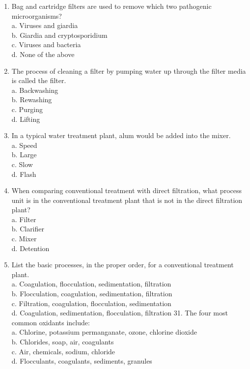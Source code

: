 \begin{enumerate}
\item Bag and cartridge filters are used to remove which two pathogenic microorganisms?\\
a. Viruses and giardia\\
b. Giardia and cryptosporidium\\
c. Viruses and bacteria\\
d. None of the above\\
\item The process of cleaning a filter by pumping water up through the filter media is called the filter.\\
a. Backwashing\\
b. Rewashing\\
c. Purging\\
d. Lifting\\
\item In a typical water treatment plant, alum would be added into the mixer.\\
a. Speed\\
b. Large\\
c. Slow\\
d. Flash\\
\item When comparing conventional treatment with direct filtration, what process unit is in the conventional treatment plant that is not in the direct filtration plant?\\
a. Filter\\
b. Clarifier\\
c. Mixer\\
d. Detention\\
\item List the basic processes, in the proper order, for a conventional treatment plant.\\
a. Coagulation, flocculation, sedimentation, filtration\\
b. Flocculation, coagulation, sedimentation, filtration\\
c. Filtration, coagulation, flocculation, sedimentation\\
d. Coagulation, sedimentation, flocculation, filtration 31. The four most common oxidants include:\\
a. Chlorine, potassium permanganate, ozone, chlorine dioxide\\
b. Chlorides, soap, air, coagulants\\
c. Air, chemicals, sodium, chloride\\
d. Flocculants, coagulants, sediments, granules\\

\end{enumerate}
